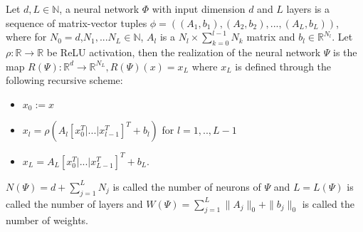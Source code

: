 \begin{definition}
Let $d, L\in \mathbb{N}$, a neural network $\Phi$ with input dimension $d$ and $L$ layers is a sequence of matrix-vector tuples $\phi = ((A_1,b_1), (A_2,b_2),..., (A_L, b_L))$, where for $N_0=d$,$N_1,...N_L\in\mathbb{N}$, $A_l$ is a $N_l \times \sum_{k=0}^{l-1}N_k$ matrix and $b_l \in \mathbb{R}^{N_l}$. Let $\rho:\mathbb{R}\rightarrow\mathbb{R}$ be ReLU activation, then the realization of the neural network $\Psi$ is the map $R(\Psi):\mathbb{R}^d\rightarrow\mathbb{R}^{N_L}, R(\Psi)(x) = x_L$ where $x_L$ is defined through the following recursive scheme:
\begin{itemize}
    \item $x_0:= x$
    \item $x_l = \rho(A_l[x_0^T|...|x^T_{l-1}]^T + b_l)$ for $l=1,..,L-1$
    \item $x_L = A_L[x_0^T|...|x^T_{L-1}]^T + b_L$.
\end{itemize}
$N(\Psi) = d + \sum_{j=1}^L N_j$ is called the number of neurons of $\Psi$ and $L = L(\Psi)$ is called the number of layers and $W(\Psi) = \sum_{j=1}^L \|A_j\|_0 + \|b_j\|_0$ is called the number of weights. 
\end{definition}



